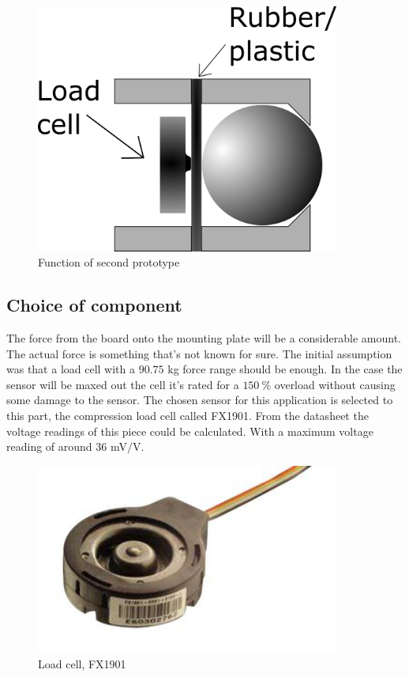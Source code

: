 \begin{figure}[H]%
\begin{center}
	\includegraphics[width = 10cm]{Figures/Press_sens_func_2.png}
	\caption{Function of second prototype}
	\label{Press_sens_prot_2}
\end{center}
\end{figure}

\subsection{Choice of component}

The force from the board onto the mounting plate will be a considerable amount. The actual force is something that’s not known for sure. The initial assumption was that a load cell with a $90.75$ kg force range should be enough. In the case the sensor will be maxed out the cell it's rated for a $150~\%$ overload without causing some damage to the sensor.
The chosen sensor for this application is selected to this part, the compression load cell called FX1901. 
From the datasheet the voltage readings of this piece could be calculated. With a maximum voltage reading of around $36$ mV$/$V.

 \begin{figure}[H]%
\begin{center}
	\includegraphics[width = 10cm]{Figures/Load_cell.png}
	\caption{Load cell, FX1901}
	\label{Load_cell}
\end{center}
\end{figure}



